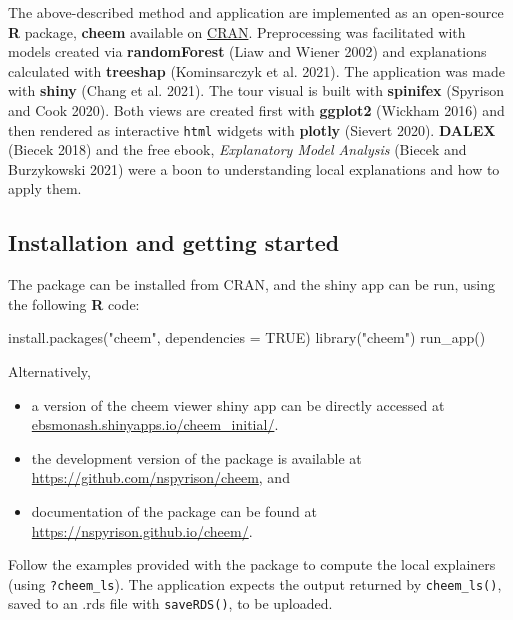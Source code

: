 \documentclass[
]{article}
\newenvironment{Shaded}{\begin{snugshade}}{\end{snugshade}}
\newcommand{\AttributeTok}[1]{\textcolor[rgb]{0.77,0.63,0.00}{#1}}
\newcommand{\ConstantTok}[1]{\textcolor[rgb]{0.00,0.00,0.00}{#1}}
\newcommand{\FunctionTok}[1]{\textcolor[rgb]{0.00,0.00,0.00}{#1}}
\newcommand{\NormalTok}[1]{#1}
\newcommand{\StringTok}[1]{\textcolor[rgb]{0.31,0.60,0.02}{#1}}
\providecommand{\tightlist}{%
  \setlength{\itemsep}{0pt}\setlength{\parskip}{0pt}}
\begin{document}
The above-described method and application are implemented as an
open-source \textbf{R} package, \textbf{cheem} available on
\href{https://CRAN.R-project.org/package=cheem}{CRAN}. Preprocessing was
facilitated with models created via \textbf{randomForest} (Liaw and
Wiener 2002) and explanations calculated with \textbf{treeshap}
(Kominsarczyk et al. 2021). The application was made with \textbf{shiny}
(Chang et al. 2021). The tour visual is built with \textbf{spinifex}
(Spyrison and Cook 2020). Both views are created first with
\textbf{ggplot2} (Wickham 2016) and then rendered as interactive
\texttt{html} widgets with \textbf{plotly} (Sievert 2020).
\textbf{DALEX} (Biecek 2018) and the free ebook, \emph{Explanatory Model
Analysis} (Biecek and Burzykowski 2021) were a boon to understanding
local explanations and how to apply them.

\hypertarget{installation-and-getting-started}{%
\subsection{Installation and getting
started}\label{installation-and-getting-started}}

The package can be installed from CRAN, and the shiny app can be run,
using the following \textbf{R} code:

\begin{Shaded}
\begin{Highlighting}[]
\FunctionTok{install.packages}\NormalTok{(}\StringTok{"cheem"}\NormalTok{, }\AttributeTok{dependencies =} \ConstantTok{TRUE}\NormalTok{)}
\FunctionTok{library}\NormalTok{(}\StringTok{"cheem"}\NormalTok{)}
\FunctionTok{run\_app}\NormalTok{()}
\end{Highlighting}
\end{Shaded}

Alternatively,

\begin{itemize}
\tightlist
\item
  a version of the cheem viewer shiny app can be directly accessed at
  \href{https://ebsmonash.shinyapps.io/cheem_initial/}{ebsmonash.shinyapps.io/cheem\_initial/}.
\item
  the development version of the package is available at
  \url{https://github.com/nspyrison/cheem}, and
\item
  documentation of the package can be found at
  \url{https://nspyrison.github.io/cheem/}.
\end{itemize}

Follow the examples provided with the package to compute the local
explainers (using \texttt{?cheem\_ls}). The application expects the
output returned by \texttt{cheem\_ls()}, saved to an .rds file with
\texttt{saveRDS()}, to be uploaded.
\end{document}
